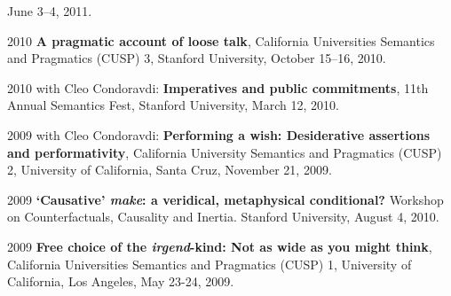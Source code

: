 \begin{dated}
		June 3--4, 2011.
	\item[2010]
		 \textbf{A pragmatic account of loose talk}, 
		 California Universities Semantics and Pragmatics (CUSP) 3, 
		 Stanford University, 
		 October 15--16, 2010.
	\item[2010]
		with Cleo Condoravdi: 
		\textbf{Imperatives and public commitments}, 
		11th Annual Semantics Fest, 
		Stanford University, 
		March 12, 2010.
	\item[2009]
		with Cleo Condoravdi: 
		\textbf{Performing a wish: Desiderative assertions and performativity},
		California University Semantics and Pragmatics (CUSP) 2, 
		University of California, Santa Cruz, 
		November 21, 2009.
	\item[2009]
		\textbf{`Causative' {\it make}: a veridical, metaphysical conditional?} 
		Workshop on Counterfactuals, Causality and Inertia. 
		Stanford University, 
		August 4, 2010.
	\item[2009]
		\textbf{Free choice of the {\it irgend}-kind: Not as wide as you might think}, California Universities Semantics and Pragmatics (CUSP) 1, 
		University of California, Los Angeles,  
		May 23-24, 2009.
\end{dated}



